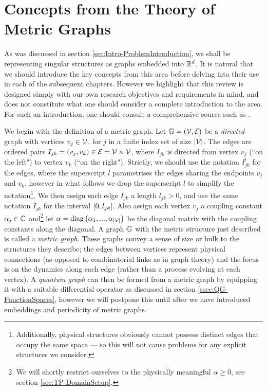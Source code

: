 \section{Concepts from the Theory of Metric Graphs} \label{sec:QuantumGraphs}
As was discussed in section \ref{sec:Intro-ProblemIntroduction}, we shall be representing singular structures as graphs embedded into $\mathbb{R}^d$.
It is natural that we should introduce the key concepts from this area before delving into their use in each of the subsequent chapters.
However we highlight that this review is designed simply with our own research objectives and requirements in mind, and does not constitute what one should consider a complete introduction to the area.
For such an introduction, one should consult a comprehensive source such as \cite{berkolaiko2013introduction}.

We begin with the definition of a metric graph.
Let $\mathbb{G}=\left( \mathcal{V},\mathcal{E} \right)$ be a \emph{directed} graph with vertices $v_j\in \mathcal{V}$, for $j$ in a finite index set of size $\left\lvert \mathcal{V} \right\rvert$.
The edges are ordered pairs $I_{jk}=\left( v_j, v_k \right)\in \mathcal{E}=\mathcal{V}\times\mathcal{V}$, where $I_{jk}$ is directed from vertex $v_j$ (``on the left") to vertex $v_k$ (``on the right").
Strictly, we should use the notation $I_{jk}^l$ for the edges, where the superscript $l$ parametrises the edges sharing the endpoints $v_j$ and $v_k$, however in what follows we drop the superscript $l$ to simplify the notation\footnote{Additionally, physical structures obviously cannot possess distinct edges that occupy the same space --- so this will not cause problems for any explicit structures we consider.}.
We then assign each edge $I_{jk}$ a length $l_{jk}>0$, and use the same notation $I_{jk}$ for the interval $\left[ 0,l_{jk} \right]$.
Also assign each vertex $v_j$ a coupling constant $\alpha_j\in\mathbb{C}$ and\footnote{We will shortly restrict ourselves to the physically meaningful $\alpha\geq0$, see section \ref{sec:TP-DomainSetup}.} let $\alpha=\mathrm{diag}\left( \alpha_1,...,\alpha_{\left\lvert \mathcal{V} \right\rvert} \right)$ be the diagonal matrix with the coupling constants along the diagonal.
A graph $\mathbb{G}$ with the metric structure just described is called a \emph{metric graph}.
These graphs convey a sense of size or bulk to the structures they describe; the edges between vertices represent physical connections (as opposed to combinatorial links as in graph theory) and the focus is on the dynamics along each edge (rather than a process evolving at each vertex).
A \emph{quantum graph} can then be formed from a metric graph by equipping it with a suitable differential operator as discussed in section \ref{ssec:QG-FunctionSpaces}, however we will postpone this until after we have introduced embeddings and periodicity of metric graphs.

